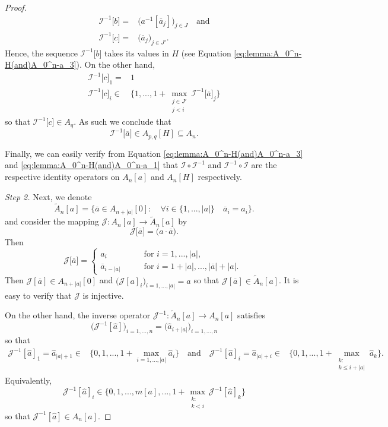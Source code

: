 \documentclass[a4paper,11pt,twoside]{article}
\numberwithin{equation}{section}
\theoremstyle{plain}
\newcommand{\cI}{\mathcal{I}}
\newcommand{\cJ}{\mathcal{J}}
\newcommand{\1}{\mathbbm{1}}
\begin{document}
\begin{proof}
\begin{align*}
			\cI^{-1}\big[ b \big] =& \big( a^{-1} [ \overline{a}_j ] \big)_{j\in J} \quad \mbox{and}
			\\
			\cI^{-1}\big[ c \big] =& \big( \overline{a}_j \big)_{j\in J'}. 
		\end{align*}
		Hence, the sequence $\cI^{-1}\big[ b \big]$ takes its values in $H$ (see Equation \eqref{eq:lemma:A_0^n-H(and)A_0^n-a_3}). On the other hand, 
		\begin{align*}
			\cI^{-1}\big[ c \big]_1 =& 1
			\\
			\cI^{-1}\big[ c \big]_i \in& \Big\{ 1, ..., 1+ \max_{\substack{j \in J' \\ j < i}} \cI^{-1}\big[ \overline{a} \big]_j \Big\}
		\end{align*}
		so that $\cI^{-1}\big[ c \big] \in A_q$. As such we conclude that
		$$
		\cI^{-1}\big[ \overline{a} \big] \in A_{p, q}[ H] \subseteq A_{n}. 
		$$
		
		Finally, we can easily verify from Equation \eqref{eq:lemma:A_0^n-H(and)A_0^n-a_3} and \eqref{eq:lemma:A_0^n-H(and)A_0^n-a_1} that $\cI \circ \cI^{-1}$ and $\cI^{-1} \circ \cI$ are the respective identity operators on $A_n[a]$ and $A_n[H]$ respectively. 
		
		\textit{Step 2.}
		Next, we denote
		$$
		\tilde{A}_n[a] = \Big\{ \overline{a} \in A_{n+|a|}[0]: \quad \forall i\in \{1, ..., |a|\} \quad \overline{a}_i = a_i \Big\}.
		$$
		and consider the mapping $\cJ: A_n[a] \to \tilde{A}_n[a]$ by
		$$
		\cJ\big[ \overline{a} \big] = \big( a\cdot \overline{a} \big). 
		$$
		Then
		$$
		\cJ\big[ \overline{a} \big] = 
		\begin{cases}
			a_i \quad&\quad \mbox{for $i=1, ..., |a|$,}
			\\
			\overline{a}_{i - |a|} \quad&\quad \mbox{for $i=1 + |a|, ..., |\overline{a}| + |a|$. }
		\end{cases}
		$$
		Then $\cJ[\overline{a}] \in A_{n+|a|}[0]$ and $\big( \cJ[a]_i \big)_{i=1, ..., |a|} = a$ so that $\cJ[\overline{a}] \in \tilde{A}_n[a]$. It is easy to verify that $\cJ$ is injective. 
		
		On the other hand, the inverse operator $\cJ^{-1}: \tilde{A}_{n}[a] \to A_n[a]$ satisfies
		$$
		\big( \cJ^{-1} [ \hat{a}] \big)_{i=1, ..., n} = \big( \hat{a}_{i+|a| } \big)_{i=1, ..., n} 
		$$
		so that
		\begin{align*}
			\cJ^{-1}[\hat{a}]_1 = \hat{a}_{|a|+1} \in& \Big\{ 0, 1, ..., 1 + \max_{i=1, ..., |a|} \hat{a}_i \Big\}
			\quad \mbox{and} \quad
			\cJ^{-1}[\hat{a}]_i = \hat{a}_{|a|+i} \in& \Big\{ 0, 1, ..., 1 + \max_{\substack{ k:\\ k \leq i+|a| }} \hat{a}_k \Big\}. 
		\end{align*}
		Equivalently, 
		$$
		\cJ^{-1}[\hat{a}]_i \in \Big\{ 0, 1, ..., m[a], ..., 1 + \max_{\substack{k:\\k< i}} \cJ^{-1}[\hat{a}]_k \Big\}
		$$
		so that $\cJ^{-1}[\hat{a}] \in A_n[a]$. 
		

\end{proof}
\end{document}
